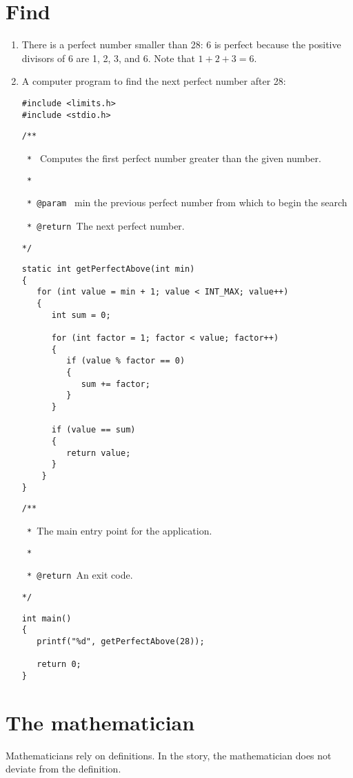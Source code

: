 \documentclass[12pt]{article}
\begin{document}
\section{Find}
\begin{enumerate}
    \item There is a perfect number smaller than 28: 6 is perfect because the positive divisors of 6 are 1, 2, 3, and 6. Note that $1+2+3=6$.
    \item A computer program to find the next perfect number after 28:
\begin{verbatim}
#include <limits.h>
#include <stdio.h>
\end{verbatim}

\verb|/**|

\verb| * | Computes the first perfect number greater than the given number.

\verb| * |

\verb| * @param | min the previous perfect number from which to begin the search

\verb| * @return |The next perfect number.

\verb|*/|
\begin{verbatim}
static int getPerfectAbove(int min)
{
   for (int value = min + 1; value < INT_MAX; value++)
   {
      int sum = 0;

      for (int factor = 1; factor < value; factor++)
      {
         if (value % factor == 0)
         {
            sum += factor;   
         }
      }
        
      if (value == sum)
      {
         return value;
      }
    }
}
\end{verbatim}

\verb|/**|

\verb| * |The main entry point for the application.

\verb| * |

\verb| * @return |An exit code.

\verb|*/|

\begin{verbatim}
int main()
{
   printf("%d", getPerfectAbove(28));

   return 0;
}
\end{verbatim}
\end{enumerate}
\section{The mathematician}
Mathematicians rely on definitions. In the story, the mathematician does not deviate from the definition.
\end{document}

